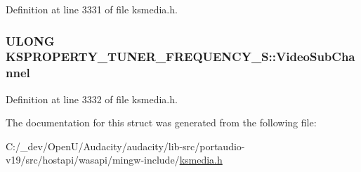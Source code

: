 Definition at line 3331 of file ksmedia.\+h.

\subsubsection[{\texorpdfstring{Video\+Sub\+Channel}{VideoSubChannel}}]{\setlength{\rightskip}{0pt plus 5cm}U\+L\+O\+NG K\+S\+P\+R\+O\+P\+E\+R\+T\+Y\+\_\+\+T\+U\+N\+E\+R\+\_\+\+F\+R\+E\+Q\+U\+E\+N\+C\+Y\+\_\+\+S\+::\+Video\+Sub\+Channel}\hypertarget{struct_k_s_p_r_o_p_e_r_t_y___t_u_n_e_r___f_r_e_q_u_e_n_c_y___s_a2303f094bba28a9e732222b4c7896478}{}\label{struct_k_s_p_r_o_p_e_r_t_y___t_u_n_e_r___f_r_e_q_u_e_n_c_y___s_a2303f094bba28a9e732222b4c7896478}


Definition at line 3332 of file ksmedia.\+h.



The documentation for this struct was generated from the following file\+:\begin{DoxyCompactItemize}
\item 
C\+:/\+\_\+dev/\+Open\+U/\+Audacity/audacity/lib-\/src/portaudio-\/v19/src/hostapi/wasapi/mingw-\/include/\hyperlink{ksmedia_8h}{ksmedia.\+h}\end{DoxyCompactItemize}
